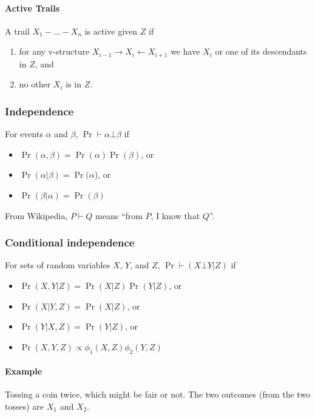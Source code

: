 \documentclass[12pt]{article}
\begin{document}
\paragraph{Active Trails}
A trail $X_1 - \ldots - X_n$ is active given $Z$ if
\begin{enumerate}
\item for any v-structure $X_{i-1} \rightarrow X_i \leftarrow X_{i+1}$ we have $X_i$ or one of its descendants in $Z$, and

\item no other $X_i$ is in $Z$.

\end{enumerate}


\subsubsection{Independence}
For events $\alpha$ and $\beta$, $\Pr \vdash \alpha \bot \beta$ if

\begin{itemize}
  \item $\Pr(\alpha, \beta) = \Pr(\alpha) \Pr(\beta)$, or

  \item $\Pr(\alpha | \beta) = \Pr(\alpha$), or

  \item $\Pr(\beta | \alpha) = \Pr(\beta)$
\end{itemize}

From Wikipedia, $P \vdash Q$ means ``from $P$, I know that $Q$''.

\subsubsection{Conditional independence}
For sets of random variables $X$, $Y$, and $Z$, $\Pr \vdash (X \bot Y | Z)$ if

\begin{itemize}
  \item $\Pr(X, Y|Z) = \Pr(X|Z) \Pr(Y|Z)$, or

  \item $\Pr(X|Y, Z) = \Pr(X|Z)$, or

  \item $\Pr(Y|X, Z) = \Pr(Y|Z)$, or

  \item $\Pr(X, Y, Z) \propto \phi_1(X, Z) \phi_2(Y, Z) $
\end{itemize}



\paragraph{Example}  Tossing a coin twice, which might be fair or not. The two outcomes (from the two tosses) are $X_1$ and $X_2$.
\end{document}

